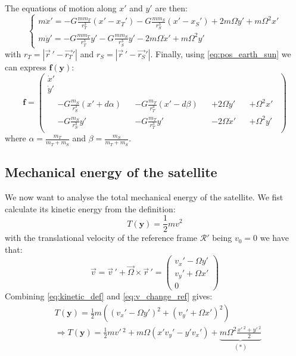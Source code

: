 The equations of motion along \(x'\) and \(y'\) are then:
\begin{equation}
    \begin{cases}
        m \ddot x' = -G \frac{m m_T}{r_T^3} (x' - x_T')
        - G \frac{m m_S}{r_S^3} (x' - x_S')
        + 2 m \Omega \dot y'
        + m \Omega^2 x' \\
        m \ddot y' = -G \frac{m m_T}{r_T^3} y'
        - G \frac{m m_S}{r_S^3} y'
        - 2 m \Omega \dot x'
        + m \Omega^2 y'
    \end{cases}
\end{equation}
with \(r_T = |\vec{r}\,' - \vec{r_T}'|\) and \(r_S = |\vec{r}\,' - \vec{r_S}'|\). Finally, using \autoref{eq:pos_earth_sun} we can express \(\mathbf f(\mathbf y)\):
\begin{equation}
    \mathbf f = \left(\begin{gathered}
        \dot x' \\
        \dot y' \\
        \begin{aligned}
            &-G \frac{m_S}{r_S^3} (x' + d \alpha) &&- G \frac{m_T}{r_T^3} (x' - d \beta) &&+ 2 \Omega \dot y' &&+ \Omega^2 x' \\
            &-G \frac{m_S}{r_S^3} y' &&-G \frac{m_T}{r_T^3} y' &&- 2 \Omega \dot x' &&+ \Omega^2 y'
        \end{aligned}
    \end{gathered}\right)
\end{equation}
where \(\alpha = \frac{m_T}{m_T + m_S}\) and \(\beta = \frac{m_S}{m_T + m_S}\).

\subsection{Mechanical energy of the satellite}
We now want to analyse the total mechanical energy of the satellite. We fist calculate its kinetic energy from the definition:
\begin{equation}
    T(\mathbf{y}) = \frac{1}{2}m v^2
    \label{eq:kinetic_def}
\end{equation}
with the translational velocity of the reference frame $\mathcal{R}'$ being $v_0 = 0$ we have that:
\begin{equation}
    \vec{v} = \vec{v}\,' + \vec{\Omega}\times\vec{r}\,' = \left(\begin{matrix} v_x' - \Omega y' \\ v_y' + \Omega x' \\ 0 \end{matrix}\right)
    \label{eq:v_change_ref}
\end{equation}
Combining \autoref{eq:kinetic_def} and \autoref{eq:v_change_ref} gives:
\begin{equation}
    \begin{aligned}
        & T(\mathbf{y}) = \frac{1}{2}m\left((v_x' - \Omega y')^2 + (v_y' + \Omega x')^2\right) \\
        & \Rightarrow T(\mathbf{y}) = \frac{1}{2}mv'\,^2 + m\Omega(x'v_y' - y'v_x') + \underbrace{m\Omega^2\frac{x'\,^2 + y'\,^2}{2}}_{(\ast)}
    \end{aligned}
    \label{eq:kinetic_frame_rot}
\end{equation}

